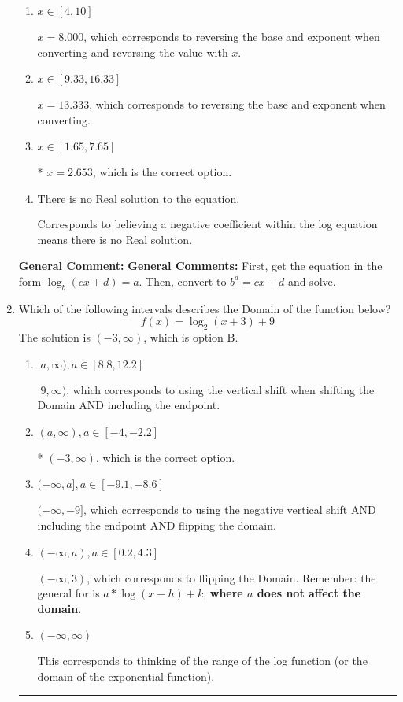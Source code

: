 \documentclass{extbook}[14pt]
\newcommand{\litem}[1]{\item #1

\rule{\textwidth}{0.4pt}}
\begin{document}
\begin{enumerate}
{\begin{enumerate}[label=\Alph*.]
$x = -5.667$, which corresponds to ignoring the vertical shift when converting to exponential form.
\item \( x \in [4, 10] \)

$x = 8.000$, which corresponds to reversing the base and exponent when converting and reversing the value with $x$.
\item \( x \in [9.33, 16.33] \)

$x = 13.333$, which corresponds to reversing the base and exponent when converting.
\item \( x \in [1.65, 7.65] \)

* $x = 2.653$, which is the correct option.
\item \( \text{There is no Real solution to the equation.} \)

Corresponds to believing a negative coefficient within the log equation means there is no Real solution.
\end{enumerate}

\textbf{General Comment:} \textbf{General Comments:} First, get the equation in the form $\log_b{(cx+d)} = a$. Then, convert to $b^a = cx+d$ and solve.
}
\litem{
Which of the following intervals describes the Domain of the function below?
\[ f(x) = \log_2{(x+3)}+9 \]The solution is \( (-3, \infty) \), which is option B.\begin{enumerate}[label=\Alph*.]
\item \( [a, \infty), a \in [8.8, 12.2] \)

$[9, \infty)$, which corresponds to using the vertical shift when shifting the Domain AND including the endpoint.
\item \( (a, \infty), a \in [-4, -2.2] \)

* $(-3, \infty)$, which is the correct option.
\item \( (-\infty, a], a \in [-9.1, -8.6] \)

$(-\infty, -9]$, which corresponds to using the negative vertical shift AND including the endpoint AND flipping the domain.
\item \( (-\infty, a), a \in [0.2, 4.3] \)

$(-\infty, 3)$, which corresponds to flipping the Domain. Remember: the general for is $a*\log(x-h)+k$, \textbf{where $a$ does not affect the domain}.
\item \( (-\infty, \infty) \)

This corresponds to thinking of the range of the log function (or the domain of the exponential function).
\end{enumerate}

}
\end{enumerate}
\end{document}

